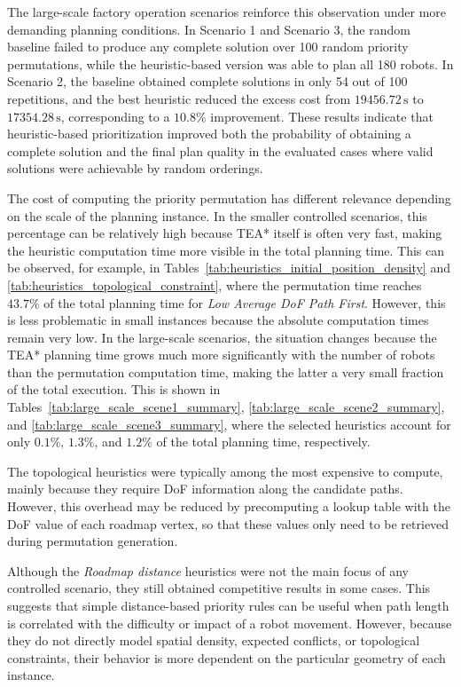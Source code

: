 The large-scale factory operation scenarios reinforce this observation under more demanding
planning conditions. In Scenario 1 and Scenario 3, the random baseline failed to produce any
complete solution over 100 random priority permutations, while the heuristic-based version was
able to plan all 180 robots. In Scenario 2, the baseline obtained complete solutions in only 54 out
of 100 repetitions, and the best heuristic reduced the excess cost from \(19456.72\,\mathrm{s}\) to
\(17354.28\,\mathrm{s}\), corresponding to a \(10.8\%\) improvement. These results indicate that
heuristic-based prioritization improved both the probability of obtaining a complete solution and the
final plan quality in the evaluated cases where valid solutions were achievable by random
orderings.

The cost of computing the priority permutation has different relevance depending on the scale of
the planning instance. In the smaller
controlled scenarios, this percentage can be relatively high because TEA* itself is often very fast,
making the heuristic computation time more visible in the total planning time. This can be observed,
for example, in Tables~\ref{tab:heuristics_initial_position_density} and
\ref{tab:heuristics_topological_constraint}, where the permutation time reaches \(43.7\%\) of the total planning time for
\textit{Low Average DoF Path First}. However, this is less problematic in small instances because
the absolute computation times remain very low. In the large-scale scenarios, the situation changes because the TEA* planning time grows much more significantly with the number of robots than the permutation computation time, making the latter a very small fraction of the total execution. This is shown in Tables~\ref{tab:large_scale_scene1_summary}, \ref{tab:large_scale_scene2_summary}, and \ref{tab:large_scale_scene3_summary}, where the selected heuristics account for only \(0.1\%\), \(1.3\%\), and \(1.2\%\) of the total planning time, respectively.

The topological heuristics were typically among the most expensive to compute, mainly because
they require DoF information along the candidate paths. However, this overhead may be reduced
by precomputing a lookup table with the DoF value of each roadmap vertex, so that these values
only need to be retrieved during permutation generation.

Although the \textit{Roadmap distance} heuristics were not the main focus of any controlled scenario, they
still obtained competitive results in some cases. This suggests that simple distance-based priority
rules can be useful when path length is correlated with the difficulty or impact of a robot movement.
However, because they do not directly model spatial density, expected conflicts, or topological
constraints, their behavior is more dependent on the particular geometry of each instance.


